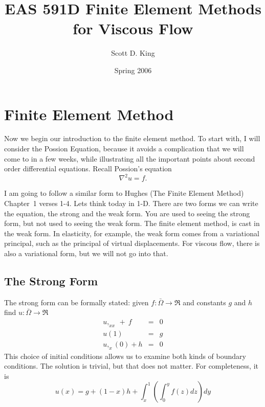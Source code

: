 \documentclass{article}
\begin{document}
\title{EAS 591D Finite Element Methods for Viscous Flow}
\author{Scott D. King}
\date{Spring 2006}
\maketitle

\pagestyle{myheadings}
\setcounter{section}{1}
\setcounter{page}{40}
\section{Finite Element Method}

Now we begin our introduction to the finite element method.  To start with, I
will consider the Possion Equation, because it avoids a complication that we
will come to in a few weeks, while illustrating all the important points about
second order differential equations.   Recall Possion's equation
\begin{equation}
\nabla^2 u = f.
\end{equation}

I am going to follow a similar form to Hughes (The Finite Element Method)
Chapter~1 verses 1-4.  Lets think today in 1-D.  There are two forms we can
write the equation, the strong and the weak form.  You are used to seeing the
strong form, but not used to seeing the weak form.   The finite element method,
is cast in the weak form.   In elasticity, for example, the weak form comes
from a variational principal, such as the principal of virtual displacements. 
For viscous flow, there is also a variational form, but we will not go into
that.

\subsection{The Strong Form}

The strong form can be formally stated: given $f: \bar \Omega \rightarrow \Re $
and constants $g$ and $h$ find $u: \bar \Omega \rightarrow \Re$
\begin{eqnarray}
u,_{xx} ~+~ f & = & 0 \\
u(1) & = & g \\
u,_x (0) + h & = & 0 
\end{eqnarray}
This choice of initial conditions allows us to examine both kinds of boundary
conditions.  The solution is trivial, but that does not matter.  For
completeness, it is
\begin{equation}
u(x) = g + (1-x) h + \int_x^1 \left ( \int_0^y f(z) dz \right ) dy
\end{equation}
\end{document}
